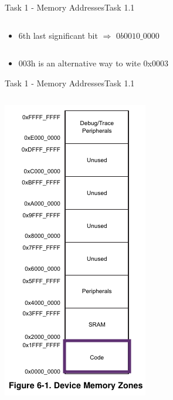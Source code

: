 \begin{frame}[allowframebreaks]{Task 1 - Memory Addresses}{Task 1.1}
\begin{solution}
\begin{columns}
\begin{column}{0.6\paperwidth}
\begin{itemize}
          \item 6th last significant bit $\Rightarrow$ $0b0010\_0000$
        \end{itemize}
      \end{column}
    \end{columns}
  \end{solution}
  \begin{Sidenote}
    \begin{itemize}
      \item 003h is an alternative way to wite 0x0003
    \end{itemize}
  \end{Sidenote}
\end{frame}

\begin{frame}[allowframebreaks]{Task 1 - Memory Addresses}{Task 1.1\vspace{0.25cm}}
  \begin{solution}
    \begin{columns}
      \begin{column}{0.3\paperwidth}
        \centering
        \includegraphics[height=0.4\paperheight]{./figures/code.png}

\end{column}
\end{columns}
\end{solution}
\end{frame}
